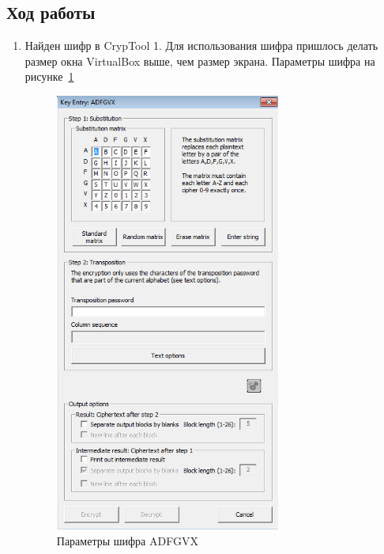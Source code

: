 \documentclass[a4paper, 14pt]{extarticle}
\begin{document}
\subsection{Ход работы}
\begin{enumerate}
    \item Найден шифр в CrypTool 1. Для использования шифра пришлось делать размер окна VirtualBox выше, чем размер экрана. Параметры шифра на рисунке~\ref{img:2:3}
    \begin{figure}[h]
        \centering
        \includegraphics[width=0.7\textwidth]{./img/ADV.png}
        \caption{Параметры шифра ADFGVX}%
        \label{img:2:3}
    \end{figure}
    

\end{enumerate}
\end{document}
